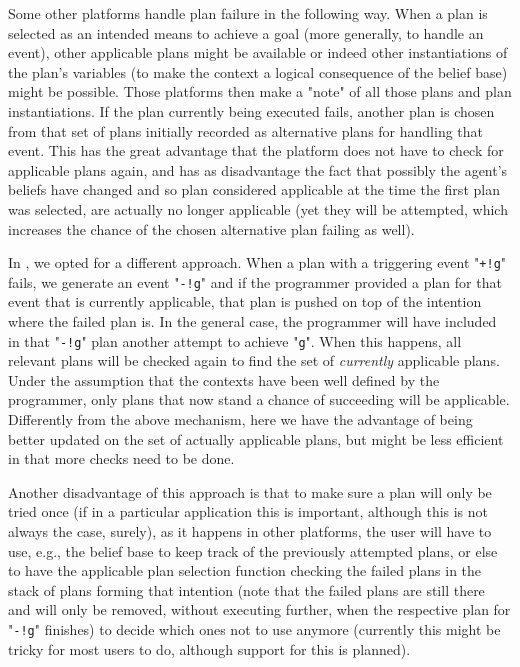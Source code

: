 \documentclass{article}
\newcommand{\jason}[0]{\htlink{\textit{Jason}}{http://jason.sf.net}\xspace}
\begin{document}
\begin{description}
Some other platforms handle plan failure in the following way. When a
plan is selected as an intended means to achieve a goal (more
generally, to handle an event), other applicable plans might be
available or indeed other instantiations of the plan's variables (to
make the context a logical consequence of the belief base) might be
possible. Those platforms then make a "note" of all those plans and
plan instantiations. If the plan currently being executed fails,
another plan is chosen from that set of plans initially recorded as
alternative plans for handling that event. This has the great
advantage that the platform does not have to check for applicable
plans again, and has as disadvantage the fact that possibly the
agent's beliefs have changed and so plan considered applicable at the
time the first plan was selected, are actually no longer applicable
(yet they will be attempted, which increases the chance of the chosen
alternative plan failing as well).

In \jason, we opted for a different approach. When a plan with a
triggering event "\texttt{+!g}" fails, we generate an event
"\texttt{-!g}" and if the programmer provided a plan for that event
that is currently applicable, that plan is pushed on top of the
intention where the failed plan is. In the general case, the
programmer will have included in that "\texttt{-!g}" plan another
attempt to achieve "\texttt{g}". When this happens, all relevant plans
will be checked again to find the set of \emph{currently} applicable
plans. Under the assumption that the contexts have been well defined
by the programmer, only plans that now stand a chance of succeeding
will be applicable. Differently from the above mechanism, here we have
the advantage of being better updated on the set of actually
applicable plans, but might be less efficient in that more checks need
to be done.

Another disadvantage of this approach is that to make sure a plan will
only be tried once (if in a particular application this is important,
although this is not always the case, surely), as it happens in other
platforms, the user will have to use, e.g., the belief base to keep
track of the previously attempted plans, or else to have the
applicable plan selection function checking the failed plans in the
stack of plans forming that intention (note that the failed plans are
still there and will only be removed, without executing further, when
the respective plan for "\texttt{-!g}" finishes) to decide which ones
not to use anymore (currently this might be tricky for most users to
do, although support for this is planned).


\end{description}
\end{document}
